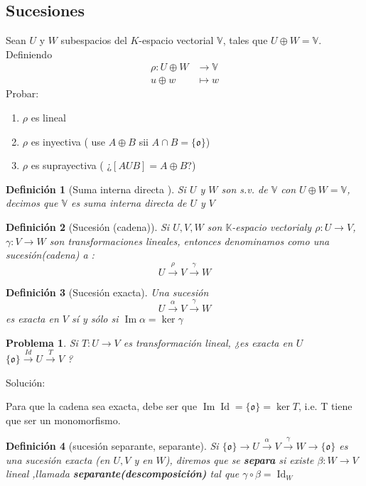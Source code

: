 \documentclass[14pt]{extarticle} %
\newtheorem{definicion}{Definición}
\theoremstyle{problemastyle} %
\newtheorem{problema}{Problema}
\newcommand{\kampo}{\mathbb{K}}
\newcommand{\kev}{$\kampo$-espacio vectorial}
\newcommand{\cero}{\mathfrak{o}} %
\newcommand{\evV}{\mathbb{V}} %
\newcommand{\bb}[1]{\mathbb{#1}}
\DeclareMathOperator{\im}{Im}
\DeclareMathOperator{\id}{Id}
\begin{document}
\subsection{Sucesiones}

Sean $U$ y $W$ subespacios del $K$-espacio vectorial $\evV$, tales que $U \oplus W = \evV$. Definiendo 
\begin{align*}
\rho : U \oplus W & \longrightarrow \evV\\
u\oplus w & \longmapsto w
\end{align*} 
Probar: 
\todo{}
\begin{enumerate}
    \item $\rho$ es lineal
    \item $\rho$ es inyectiva ( use $A \oplus B$ sii $A \cap B = \{ \cero \}$)
    \item $\rho $ es suprayectiva ( ¿$[AUB] = A \oplus B $?)
\end{enumerate}

\begin{definicion}[Suma interna directa ]
    Si $U$ y $W$ son s.v. de $\bb V$ con $U\oplus W = \evV$, decimos que $\bb V $ es \textit{suma interna directa} de $U$ y $V$

\end{definicion}

\begin{definicion}[Sucesión (cadena)]
Si $U,V,W$ son \kev y $\rho:U\rightarrow V $,$\gamma: V  \rightarrow W $ son transformaciones lineales, entonces denominamos como una \textit{sucesión(cadena)} a :
$$U \xrightarrow{ \; \rho \;  } V \xrightarrow{\;\gamma\;} W$$ 
\end{definicion}

\begin{definicion}[Sucesión exacta]
    Una sucesión 
    $$U \xrightarrow{\;\alpha\;} V \xrightarrow{\; \gamma\;} W$$
    es exacta en $V$ sí y sólo si $\im \alpha = \ker \gamma  $
\end{definicion}

\begin{problema}
    Si $T:U \longrightarrow V$ es transformación lineal, ¿es exacta en $U$ $\{\cero \} \xrightarrow{Id} U \xrightarrow{T} V$ ?
\end{problema}
Solución:

Para que la cadena sea exacta, debe ser que $ \im \id  = \{\cero\} = \ker T $, i.e. T tiene que ser un monomorfismo.

\begin{definicion}[sucesión separante, separante]
    Si  $\{\cero \} \xrightarrow {\;\;} U \xrightarrow{\;\alpha\;} V \xrightarrow{ \;\gamma\;} W \xrightarrow{\;\;} \{ \cero \}$ es una sucesión exacta (en $U,V$ y en $W$), diremos que se \textbf{separa} si existe $\beta : W \longrightarrow V$ lineal ,llamada \textbf{separante(descomposición)} tal que $\gamma \circ \beta = \id_W$
\end{definicion}
\end{document}
